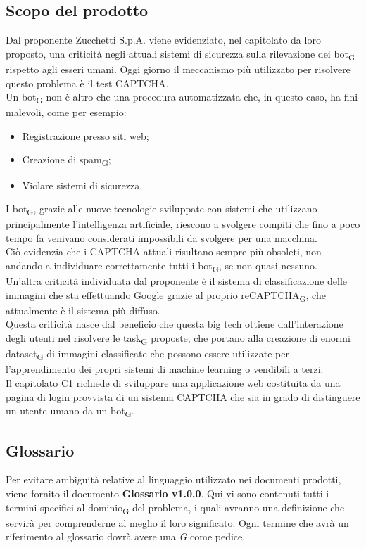 \subsection{Scopo del prodotto}
Dal proponente Zucchetti S.p.A. viene evidenziato, nel capitolato da loro proposto, una criticità negli attuali sistemi di sicurezza sulla rilevazione dei bot\textsubscript{G} rispetto agli esseri umani. Oggi giorno il meccanismo più utilizzato per risolvere questo problema è il test CAPTCHA.\\
Un bot\textsubscript{G} non è altro che una procedura automatizzata che, in questo caso, ha fini malevoli, come per esempio:
\begin{itemize}
	\item Registrazione presso siti web;
	\item Creazione di spam\textsubscript{G};
	\item Violare sistemi di sicurezza.
\end{itemize}
I bot\textsubscript{G}, grazie alle nuove tecnologie sviluppate con sistemi che utilizzano principalmente l'intelligenza artificiale, riescono a svolgere compiti che fino a poco tempo fa venivano considerati impossibili da svolgere per una macchina.\\
Ciò evidenzia che i CAPTCHA attuali risultano sempre più obsoleti, non andando a individuare correttamente tutti i bot\textsubscript{G}, se non quasi nessuno.\\
Un'altra criticità individuata dal proponente è il sistema di classificazione delle immagini che sta effettuando Google grazie al proprio reCAPTCHA\textsubscript{G}, che attualmente è il sistema più diffuso.\\
Questa criticità nasce dal beneficio che questa big tech ottiene dall'interazione degli utenti nel risolvere le task\textsubscript{G} proposte, che portano alla creazione di enormi dataset\textsubscript{G} di immagini classificate che possono essere utilizzate per l'apprendimento dei propri sistemi di machine learning o vendibili a terzi.\\
Il capitolato C1 richiede di sviluppare una applicazione web costituita da una pagina di login provvista di un sistema CAPTCHA che sia in grado di distinguere un utente umano da un bot\textsubscript{G}.\\

\subsection{Glossario}
Per evitare ambiguità relative al linguaggio utilizzato nei documenti prodotti, viene fornito il documento \textbf{Glossario v1.0.0}. Qui vi sono contenuti tutti i termini specifici al dominio\textsubscript{G} del problema, i quali avranno una definizione che servirà per comprenderne al meglio il loro significato. Ogni termine che avrà un riferimento al glossario dovrà avere una \textit{G} come pedice. 


